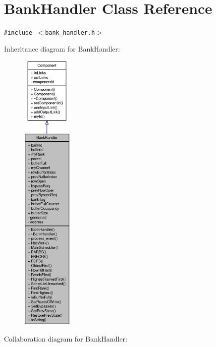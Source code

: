 \section{BankHandler Class Reference}
\label{classBankHandler}
{\tt \#include $<$bank\_\-handler.h$>$}

Inheritance diagram for BankHandler:\nopagebreak
\begin{figure}[H]
\begin{center}
\leavevmode
\includegraphics[height=400pt]{classBankHandler__inherit__graph}
\end{center}
\end{figure}
Collaboration diagram for BankHandler:\nopagebreak

